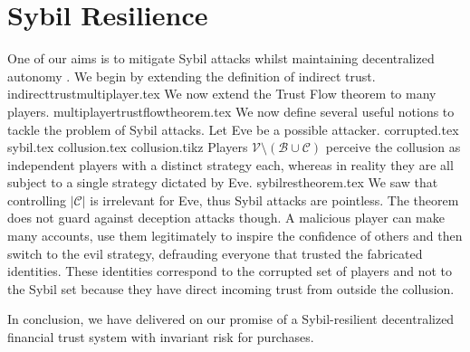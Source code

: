 \section{Sybil Resilience}
  One of our aims is to mitigate Sybil attacks \cite{sybilattack} whilst maintaining decentralized autonomy \cite{dionyziz}.
  We begin by extending the definition of indirect trust.
  {indirecttrustmultiplayer.tex}
  \noindent We now extend the Trust Flow theorem to many players.
  {multiplayertrustflowtheorem.tex}
  \noindent We now define several useful notions to tackle the problem of Sybil attacks. Let Eve be a possible attacker.
  {corrupted.tex}
  {sybil.tex}
  {collusion.tex}
  {collusion.tikz}
  Players $\mathcal{V} \setminus (\mathcal{B} \cup \mathcal{C})$ perceive the collusion as independent players with a distinct
  strategy each, whereas in reality they are all subject to a single strategy dictated by Eve.
  {sybilrestheorem.tex}
  We saw that controlling $|\mathcal{C}|$ is irrelevant for Eve, thus Sybil attacks are pointless. The theorem does not guard
  against deception attacks though. A malicious player can make many accounts, use them legitimately to inspire the confidence
  of others and then switch to the evil strategy, defrauding everyone that trusted the fabricated identities. These identities
  correspond to the corrupted set of players and not to the Sybil set because they have direct incoming trust from outside the
  collusion.

  In conclusion, we have delivered on our promise of a Sybil-resilient decentralized financial trust system with invariant
  risk for purchases.


